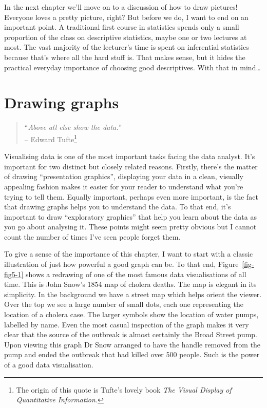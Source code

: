\documentclass[
  a4paper,
]{book}
\begin{document}
In the next chapter we'll move on to a discussion of how to draw
pictures! Everyone loves a pretty picture, right? But before we do, I
want to end on an important point. A traditional first course in
statistics spends only a small proportion of the class on descriptive
statistics, maybe one or two lectures at most. The vast majority of the
lecturer's time is spent on inferential statistics because that's where
all the hard stuff is. That makes sense, but it hides the practical
everyday importance of choosing good descriptives. With that in
mind\ldots{}

\hypertarget{sec-Drawing-graphs}{%
\chapter{Drawing graphs}\label{sec-Drawing-graphs}}

\begin{quote}
``\emph{Above all else show the data.}''\\
-- Edward Tufte\footnote{The origin of this quote is Tufte's lovely book
  \emph{The Visual Display of Quantitative Information.}}
\end{quote}

Visualising data is one of the most important tasks facing the data
analyst. It's important for two distinct but closely related reasons.
Firstly, there's the matter of drawing ``presentation graphics'',
displaying your data in a clean, visually appealing fashion makes it
easier for your reader to understand what you're trying to tell them.
Equally important, perhaps even more important, is the fact that drawing
graphs helps you to understand the data. To that end, it's important to
draw ``exploratory graphics'' that help you learn about the data as you
go about analysing it. These points might seem pretty obvious but I
cannot count the number of times I've seen people forget them.

To give a sense of the importance of this chapter, I want to start with
a classic illustration of just how powerful a good graph can be. To that
end, Figure~\ref{fig-fig5-1} shows a redrawing of one of the most famous
data visualisations of all time. This is John Snow's 1854 map of cholera
deaths. The map is elegant in its simplicity. In the background we have
a street map which helps orient the viewer. Over the top we see a large
number of small dots, each one representing the location of a cholera
case. The larger symbols show the location of water pumps, labelled by
name. Even the most casual inspection of the graph makes it very clear
that the source of the outbreak is almost certainly the Broad Street
pump. Upon viewing this graph Dr Snow arranged to have the handle
removed from the pump and ended the outbreak that had killed over 500
people. Such is the power of a good data visualisation.
\end{document}
